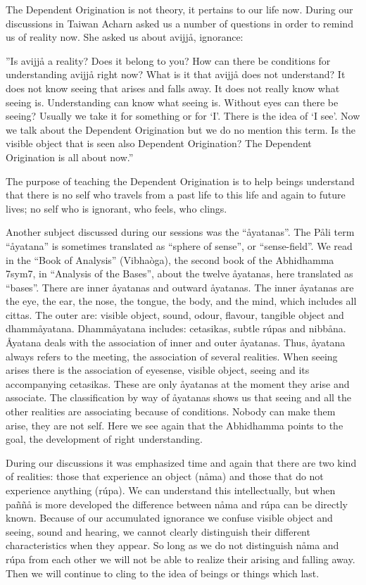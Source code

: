 \documentclass[10pt,a4paper,final]{article}
\begin{document}
The Dependent Origination is not theory, it
pertains to our life now. During our discussions in Taiwan Acharn asked
us a number of questions in order to remind us of reality now. She asked
us about avijjå, ignorance: 

''Is avijjå a reality? Does it belong to
you? How can there be conditions for understanding
avijjå right now? What is it that
avijjå does not understand? It does not know
seeing that arises and falls away. It does not really know what seeing
is. Understanding can know what seeing is. Without eyes can there be
seeing? Usually we take it for something or for `I'. There is the idea
of `I see'. Now we talk about the Dependent Origination but we do no
mention this term. Is the visible object that is seen also Dependent
Origination? The Dependent Origination is all about now.''

The purpose of teaching the Dependent
Origination is to help beings understand that there is no self who
travels from a past life to this life and again to future lives; no self
who is ignorant, who feels, who clings.

Another subject discussed during our
sessions was the ``åyatanas''. The
Påli term
``åyatana'' is sometimes translated as
``sphere of
sense'', or ``sense-field''.
We read in the ``Book of Analysis''
(Vibhaòga), the second book
of the Abhidhamma
\protect\hyperlinksdfootnote7sym7,
in ``Analysis of the
Bases'', about the twelve
åyatanas, here translated
as ``bases''. There are
inner åyatanas and outward
åyatanas. The inner
åyatanas are
the eye, the ear, the nose, the tongue,
the body, and the
mind, which includes all cittas. The outer
 are:
visible object, sound, odour, flavour,
tangible object and dhammåyatana.
Dhammåyatana includes: cetasikas,
subtle rúpas and nibbåna. Åyatana deals with the association
of inner and outer åyatanas. Thus, åyatana
always refers to the meeting, the association of several realities. When
seeing arises there is the association of eyesense, visible object,
seeing and its accompanying cetasikas. These are only åyatanas at the
moment they arise and associate. The
classification by way of åyatanas shows us that
seeing and all the other realities are associating because of
conditions. Nobody can make them arise, they are not self.
Here we see again that the Abhidhamma
points to the goal, the development of right understanding.

During our discussions it was emphasized
time and again that there are two kind of realities: those that
experience an object (nåma) and those that do not experience anything
(rúpa). We can understand this intellectually, but when paññå is more
developed the difference between nåma and rúpa can be directly known.
Because of our accumulated ignorance we
confuse visible object and seeing, sound and hearing, we cannot clearly
distinguish their different characteristics when they appear. So long as
we do not distinguish nåma
and rúpa from each other we will not be
able to realize their arising and falling away. Then we will continue to
cling to the idea of beings or things which last. 
\end{document}
